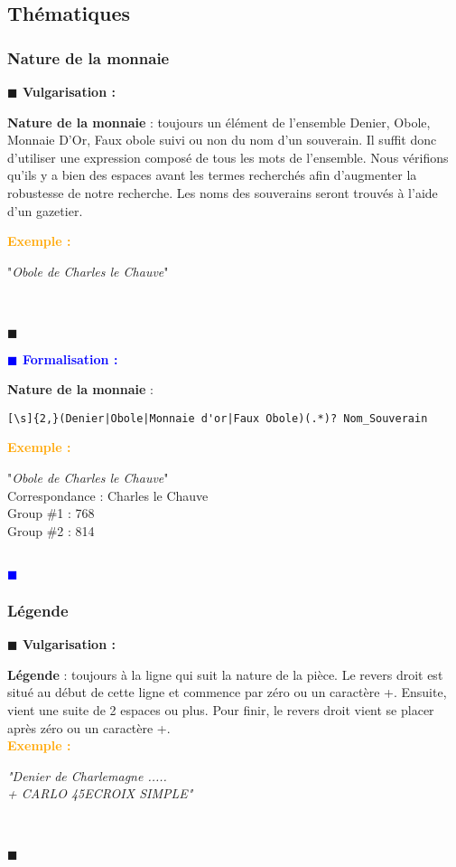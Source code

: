 \documentclass[a4paper, 11pt]{article}
\newenvironment{vulgarisation}
    {
    \textbf{\textcolor{dark-blue}{$\blacksquare$  Vulgarisation : \\}}

    }
    {
    ~\\\textcolor{dark-blue}{$\blacksquare$}\\
    }
\newenvironment{formalisation}
    {
    \textbf{\textcolor{blue}{$\blacksquare$  Formalisation : \\}}
    }
    {
    ~\\\textcolor{blue}{$\blacksquare$}\\
    }
\newenvironment{exemple}
    {
    \textbf{\textcolor{orange}{
    Exemple : \\}}
    }
    {\\
    }
\begin{document}
\newpage
\subsection{Thématiques}
\subsubsection{Nature de la monnaie}
\begin{vulgarisation}
	\textbf{Nature de la monnaie} : toujours un élément de l'ensemble {Denier, Obole, Monnaie D'Or, Faux obole} suivi ou non du nom d'un souverain. Il suffit donc d'utiliser une expression composé de tous les mots de l'ensemble. Nous vérifions qu'ils y a bien des espaces avant les termes recherchés afin d'augmenter la robustesse de notre recherche. Les noms des souverains seront trouvés à l'aide d'un gazetier.
	
	\begin{exemple}
		"\emph{Obole de Charles le Chauve}" \\
	\end{exemple}
\end{vulgarisation}

\begin{formalisation}
	\textbf{Nature de la monnaie} :
	\begin{verbatim}
[\s]{2,}(Denier|Obole|Monnaie d'or|Faux Obole)(.*)? Nom_Souverain
	\end{verbatim}
	\begin{exemple}
		"\emph{Obole de Charles le Chauve}" \\
		Correspondance : Charles le Chauve \\
		Group \#1 : 768 \\
		Group \#2 : 814
	\end{exemple}
\end{formalisation}

\subsubsection{Légende}
\begin{vulgarisation}
	\textbf{Légende} : toujours à la ligne qui suit la nature de la pièce. Le revers droit est situé au début de cette ligne et commence par zéro ou un caractère +. Ensuite, vient une suite de 2 espaces ou plus. Pour finir, le revers droit vient se placer après zéro ou un caractère +.\\
	\begin{exemple}
		\emph{"Denier de Charlemagne ..... \\+ CARLO  45E\indent\indent CROIX SIMPLE"}\\
	\end{exemple}
\end{vulgarisation}
\end{document}
